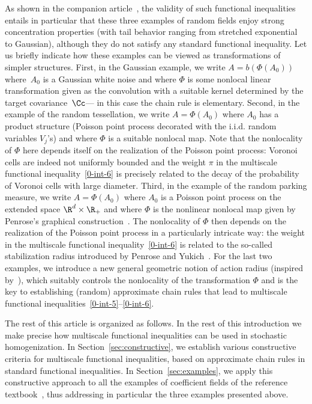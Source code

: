 As shown in the companion article~\cite{DG1}, the validity of such functional inequalities entails in particular that these three examples of random fields enjoy strong concentration properties (with tail behavior ranging from stretched exponential to Gaussian), although they do not satisfy any standard functional inequality. Let us briefly indicate how these examples can be viewed as transformations of simpler structures. First, in the Gaussian example, we write $A=b(\Phi(A_0))$ where~$A_0$ is a Gaussian white noise and where $\Phi$ is some nonlocal linear transformation given as the convolution with a suitable kernel determined by the target covariance~$\Cc$\linebreak--- in this case the chain rule is elementary. Second, in the example of the random tessellation, we write $A=\Phi(A_0)$ where $A_0$ has a product structure (Poisson point process decorated with the i.i.d. random variables $V_j$'s) and where $\Phi$ is a suitable nonlocal map. Note that the nonlocality of $\Phi$ here depends itself on the realization of the Poisson point process: Voronoi cells are indeed not uniformly bounded and the weight $\pi$ in the multiscale functional inequality~\eqref{0-int-6} is precisely related to the decay of the probability of Voronoi cells with large diameter. Third, in the example of the random parking measure, we write $A=\Phi(A_0)$ where $A_0$ is a Poisson point process on the extended space $\R^d\times\R_+$ and where $\Phi$ is the nonlinear nonlocal map given by Penrose's graphical construction~\cite{Penrose-01}. The nonlocality of $\Phi$ then depends on the realization of the Poisson point process in a particularly intricate way: the weight in the multiscale functional inequality~\eqref{0-int-6} is related to the so-called stabilization radius introduced by Penrose and Yukich~\cite{Penrose-Yukich-02}. For the last two examples, we introduce a new general geometric notion of action radius (inspired by~\cite{Penrose-Yukich-02}), which suitably controls the nonlocality of the transformation $\Phi$ and is the key to establishing (random) approximate chain rules that lead to multiscale functional inequalities~\eqref{0-int-5}--\eqref{0-int-6}.


The rest of this article is organized as follows. In the rest of this introduction we make precise how multiscale functional inequalities can be used in stochastic homogenization. In Section~\ref{sec:constructive}, we establish various constructive criteria for multiscale functional inequalities, based on approximate chain rules in standard functional inequalities. In Section~\ref{sec:examples}, we apply this constructive approach to all the examples of coefficient fields of the reference textbook~\cite{Torquato-02}, thus addressing in particular the three examples presented above.

